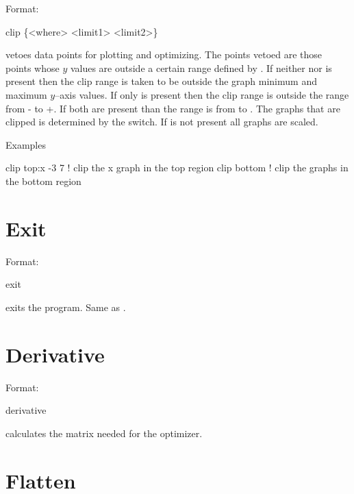 Format:
\begin{example}
  clip \{<where> <limit1> <limit2>\}
\end{example}

\vskip 0.2in 
 vetoes data points for plotting and optimizing. The points
vetoed are those points whose $y$ values are outside a certain range
defined by  . If neither  nor
 is present then the clip range is taken to be outside
the graph minimum and maximum $y$--axis values. If only 
is present then the clip range is outside the range from
- to +. If both are present than the range
is from  to .  The graphs that are clipped
is determined by the  switch.  If  is not
present all graphs are scaled.

Examples
\begin{example}
  clip top:x -3  7  ! clip the x graph in the top region
  clip bottom       ! clip the graphs in the bottom region
\end{example}

\section{Exit}
\label{s:exit}

Format:
\begin{example}
  exit
\end{example}

\vskip 0.2in
 exits the program. Same as .

\section{Derivative}
\label{s:deriv}

Format:
\begin{example}
  derivative
\end{example}

\vskip 0.2in
 calculates the  matrix needed for the  optimizer.

\section{Flatten}
\label{s:flatten}

